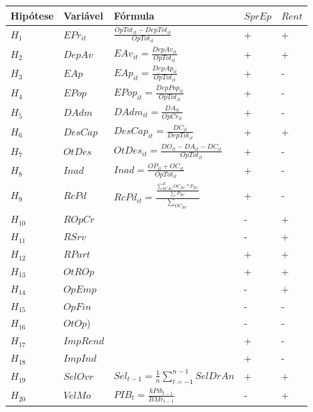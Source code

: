 \documentclass[
  12pt,
  12pt,
  openright,
  oneside,
  a4paper,
  chapter=TITLE,
  section=TITLE,
  subsection=TITLE,
  subsubsection=TITLE,
  english,
  portugues,
  sumario=tradicional]{abntex2}
\begin{document}
\begin{longtable}[]{@{}
  >{\centering\arraybackslash}p{}
  >{\centering\arraybackslash}p{}
  >{\centering\arraybackslash}p{}
  >{\centering\arraybackslash}p{}
  >{\centering\arraybackslash}p{}@{}}
\toprule
Hipótese & Variável & Fórmula & \(SprEp\) & \(Rent\) \\
\midrule
\endhead
\(H_{1}\) & \(EPr_{it}\) & \(\frac{OpTot_{it} - DepTot_{it}}{OpTot_{it}}\) & + & + \\
\(H_{2}\) & \(DepAv\) & \(EAv_{it} = \frac{DepAv_{it}}{OpTot_{it}}\) & + & + \\
\(H_{3}\) & \(EAp\) & \(EAp_{it} = \frac{DepAp_{it}}{OpTot_{it}}\) & + & - \\
\(H_{4}\) & \(EPop\) & \(EPop_{it} = \frac{DepPop_{it}}{OpTot_{it}}\) & + & - \\
\(H_{5}\) & \(DAdm\) & \(DAdm_{it} = \frac{DA_{it}}{OpCr_{it}}\) & + & - \\
\(H_{6}\) & \(DesCap\) & \(DesCap_{it} = \frac{DC_{it}}{DepTot_{it}}\) & + & + \\
\(H_{7}\) & \(OtDes\) & \(OtDes_{it} = \frac{ DO_{it} - DA_{it} - DC_{it} }{ OpTot_{it} }\) & + & - \\
\(H_{8}\) & \(Inad\) & \(Inad = \frac{ OP_{it} + OC_{it} }{OpTot_{it}}\) & + & - \\
\(H_{9}\) & \(RcPd\) & \(RcPd_{it} = \frac{\frac{\sum_{RCAa}^HOC_{RC}*P_{RC}}{\sum_{}P_{RC}}}{\sum_{OC_{RC}}}\) & + & - \\
\(H_{10}\) & \(ROpCr\) & & - & + \\
\(H_{11}\) & \(RSrv\) & & - & + \\
\(H_{12}\) & \(RPart\) & & + & + \\
\(H_{13}\) & \(OtROp\) & & + & + \\
\(H_{14}\) & \(OpEmp\) & & - & + \\
\(H_{15}\) & \(OpFin\) & & - & - \\
\(H_{16}\) & \(OtOp\)) & & - & - \\
\(H_{17}\) & \(ImpRend\) & & + & - \\
\(H_{18}\) & \(ImpInd\) & & + & - \\
\(H_{19}\) & \(SelOvr\) & \(Sel_{t-1} = \frac{1}{n}\sum_{t=-1}^{n-1}SelDrAn\) & + & + \\
\(H_{20}\) & \(VelMo\) & \(PIB_{t} = \frac{k Pib_{t-1}}{BMr_{t-1}}\) & - & + \\

\end{longtable}
\end{document}
